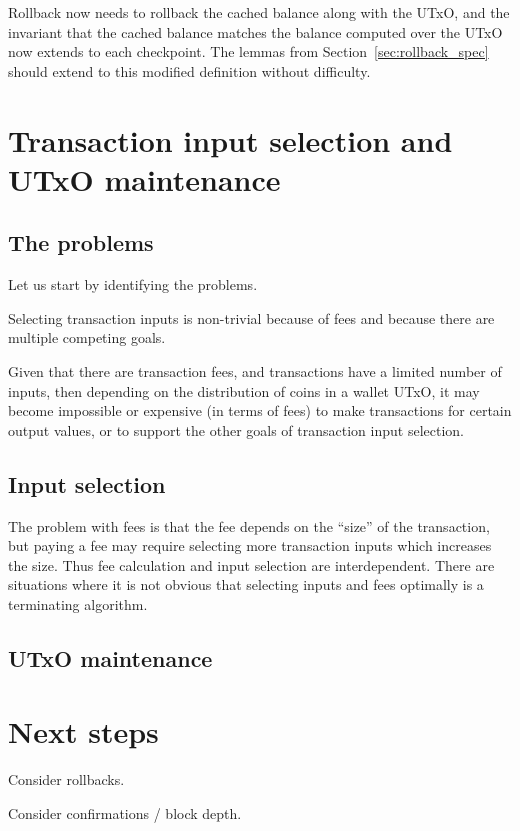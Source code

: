 \documentclass{article}
\begin{document}
Rollback now needs to rollback the cached balance along with the UTxO, and the
invariant that the cached balance matches the balance computed over the UTxO
now extends to each checkpoint. The lemmas from Section~\ref{sec:rollback_spec}
should extend to this modified definition without difficulty.

\section{Transaction input selection and UTxO maintenance}

\subsection{The problems}

Let us start by identifying the problems.

Selecting transaction inputs is non-trivial because of fees and because there
are multiple competing goals.

Given that there are transaction fees, and transactions have a limited number
of inputs, then depending on the distribution of coins in a wallet UTxO, it
may become impossible or expensive (in terms of fees) to make transactions
for certain output values, or to support the other goals of transaction input
selection.

\subsection{Input selection}

The problem with fees is that the fee depends on the ``size'' of the
transaction, but paying a fee may require selecting more transaction inputs
which increases the size. Thus fee calculation and input
selection are interdependent. There are situations where it is not obvious that
selecting inputs and fees optimally is a terminating algorithm.

\subsection{UTxO maintenance}



\section{Next steps}

Consider rollbacks.

Consider confirmations / block depth.
\end{document}
